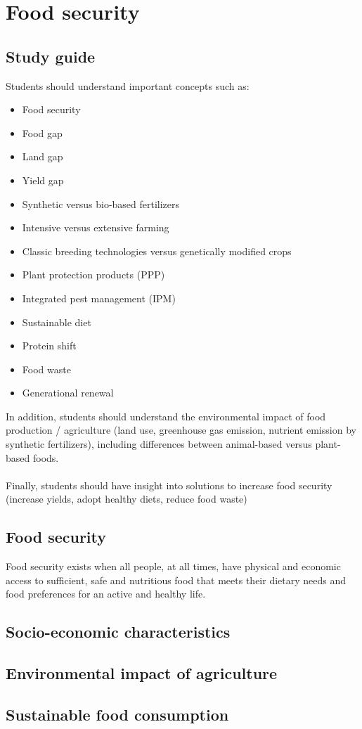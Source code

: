 \documentclass[../summary.tex]{subfiles}
\begin{document}
	
	\section{Food security}
	
	\subsection{Study guide}
	
	Students should understand important concepts such as:
	\begin{itemize} 
	\item Food security
	\item Food gap
	\item Land gap
	\item Yield gap
	\item Synthetic versus bio-based fertilizers
	\item Intensive versus extensive farming
	\item Classic breeding technologies versus genetically modified crops
	\item Plant protection products (PPP)
	\item Integrated pest management (IPM)
	\item Sustainable diet
	\item Protein shift
	\item Food waste
	\item Generational renewal
	\end{itemize}
	In addition, students should understand the environmental impact of food production / agriculture (land use, greenhouse gas emission, nutrient emission by synthetic fertilizers), including differences between animal-based versus plant-based foods.
	\\\\
	Finally, students should have insight into solutions to increase food security (increase yields, adopt healthy
	diets, reduce food waste)
	
	\subsection{Food security}
	
	Food security exists when all people, at all times, have physical and economic access to sufficient, safe and nutritious food that meets their dietary needs and food preferences for an active and healthy life. 
	
	\subsection{Socio-economic characteristics}
	
	
	
	\subsection{Environmental impact of agriculture}
	
	\subsection{Sustainable food consumption}
	
\end{document}
